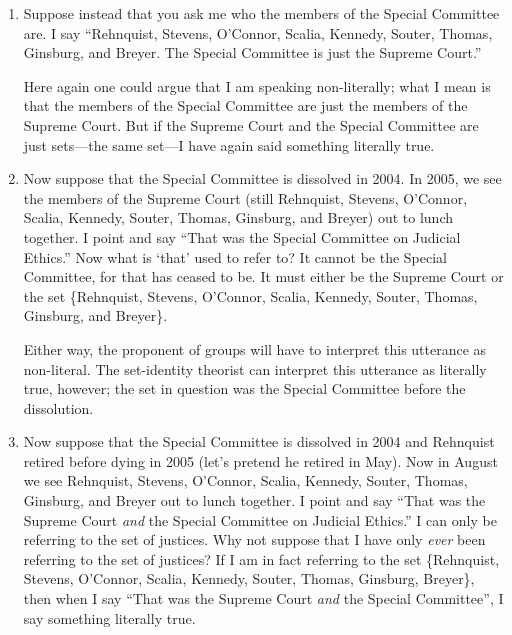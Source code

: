 \documentclass[12pt,twoside]{reedfancy}
\begin{document}
\begin{spacing}{1.25}
\begin{enumerate}
  \item Suppose instead that you ask me who the members of the Special
    Committee are.  I say ``Rehnquist, Stevens, O'Connor, Scalia,
    Kennedy, Souter, Thomas, Ginsburg, and Breyer.  The Special
    Committee is just the Supreme Court.''  

    Here again one could argue that I am speaking non-literally; what
    I mean is that the members of the Special Committee are just the
    members of the Supreme Court.  But if the Supreme Court and the
    Special Committee are just sets---the same set---I have again said
    something literally true.

  \item Now suppose that the Special Committee is dissolved in 2004.
    In 2005, we see the members of the Supreme Court (still Rehnquist,
    Stevens, O'Connor, Scalia, Kennedy, Souter, Thomas, Ginsburg, and
    Breyer) out to lunch together.  I point and say ``That was the
    Special Committee on Judicial Ethics.''  Now what is `that' used
    to refer to?  It cannot be the Special Committee, for that has
    ceased to be.  It must either be the Supreme Court or the set
    \{Rehnquist, Stevens, O'Connor, Scalia, Kennedy, Souter, Thomas,
    Ginsburg, and Breyer\}.

    Either way, the proponent of groups will have to interpret this
    utterance as non-literal.  The set-identity theorist can interpret
    this utterance as literally true, however; the set in question was
    the Special Committee before the dissolution.

  \item Now suppose that the Special Committee is dissolved in 2004
    and Rehnquist retired before dying in 2005 (let's pretend he
    retired in May).  Now in August we see Rehnquist, Stevens,
    O'Connor, Scalia, Kennedy, Souter, Thomas, Ginsburg, and Breyer
    out to lunch together.  I point and say ``That was the Supreme
    Court {\em and} the Special Committee on Judicial Ethics.''  I can
    only be referring to the set of justices.  Why not suppose that I
    have only {\em ever} been referring to the set of justices?  If I
    am in fact referring to the set \{Rehnquist, Stevens, O'Connor,
    Scalia, Kennedy, Souter, Thomas, Ginsburg, Breyer\}, then when I
    say ``That was the Supreme Court {\em and} the Special
    Committee'', I say something literally true.
\end{enumerate}


\end{spacing}
\end{document}
